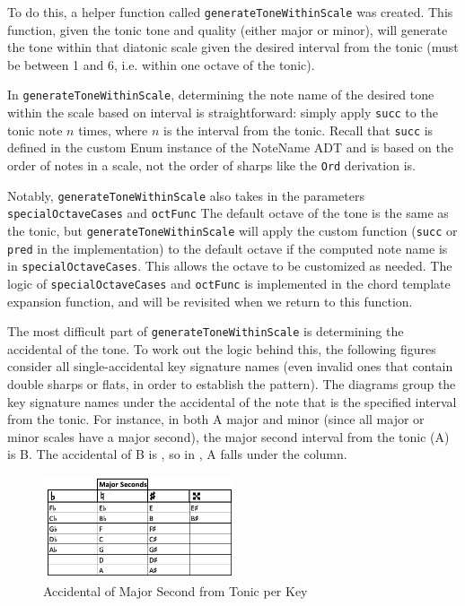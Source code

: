 \documentclass{report}
\begin{document}
To do this, a helper function called \verb.generateToneWithinScale. was created. This function, given the tonic tone and quality (either major or minor), will generate the tone within that diatonic scale given the desired interval from the tonic (must be between 1 and 6, i.e. within one octave of the tonic). 

In \verb.generateToneWithinScale., determining the note name of the desired tone within the scale based on interval is straightforward: simply apply \verb.succ. to the tonic note $n$ times, where $n$ is the interval from the tonic. Recall that \verb.succ. is defined in the custom Enum instance of the NoteName ADT and is based on the order of notes in a scale, not the order of sharps like the \verb.Ord. derivation is.

Notably, \verb.generateToneWithinScale. also takes in the parameters \verb.specialOctaveCases. and \verb.octFunc. The default octave of the tone is the same as the tonic, but \verb.generateToneWithinScale. will apply the custom function (\verb.succ. or \verb.pred. in the implementation) to the default octave if the computed note name is in \verb.specialOctaveCases.. This allows the octave to be customized as needed. The logic of \verb.specialOctaveCases. and \verb.octFunc. is implemented in the chord template expansion function, and will be revisited when we return to this function.

The most difficult part of \verb.generateToneWithinScale. is determining the accidental of the tone. To work out the logic behind this, the following figures consider all single-accidental key signature names (even invalid ones that contain double sharps or flats, in order to establish the pattern). The diagrams group the key signature names under the accidental of the note that is the specified interval from the tonic. For instance, in both A\musFlat\; major and minor (since all major or minor scales have a major second), the major second interval from the tonic (A\musFlat) is B\musFlat. The accidental of B\musFlat\; is \musFlat, so in , A\musFlat\; falls under the \musFlat\; column.

\begin{figure}[h!]
\centering
\includegraphics[width=0.5\textwidth]{images/maj_seconds}
\caption{Accidental of Major Second from Tonic per Key}
\label{maj_seconds}
\end{figure}
\end{document}
